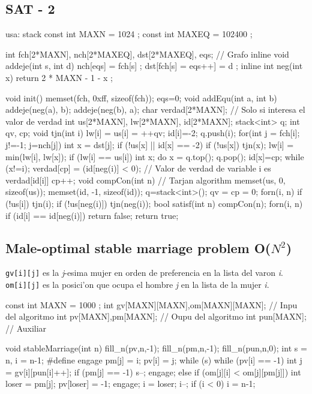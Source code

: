 \documentclass[10pt,landscape,twocolumn,a4paper,notitlepage]{article}
\begin{document}
\subsection{SAT - 2}
\begin{code}
usa: stack
const int MAXN = 1024 ;
const int MAXEQ = 102400 ;

int fch[2*MAXN], nch[2*MAXEQ], dst[2*MAXEQ], eqs; // Grafo
inline void addeje(int s, int d) { nch[eqs] = fch[s] ; dst[fch[s] = eqs++] = d ; }
inline int neg(int x) { return 2 * MAXN - 1 - x ; }

void init() {
	memset(fch, 0xff, sizeof(fch));
	eqs=0;
}
void addEqu(int a, int b) {
	addeje(neg(a), b);
	addeje(neg(b), a);
}
char verdad[2*MAXN]; // Solo si interesa el valor de verdad
int us[2*MAXN], lw[2*MAXN], id[2*MAXN];
stack<int> q; int qv, cp;
void tjn(int i) {
	lw[i] = us[i] = ++qv;
	id[i]=-2; q.push(i);
	for(int j = fch[i]; j!=-1; j=nch[j]) { int x = dst[j];
		if (!us[x] || id[x] == -2) {
			if (!us[x]) tjn(x);
			lw[i] = min(lw[i], lw[x]);
		}
	}
	if (lw[i] == us[i]) {
		int x; do { x = q.top(); q.pop(); id[x]=cp; } while (x!=i);
        verdad[cp] = (id[neg(i)] < 0); // Valor de verdad de variable i es verdad[id[i]]
		cp++;
	}
}
void compCon(int n) { // Tarjan algorithm
	memset(us, 0, sizeof(us));
	memset(id, -1, sizeof(id));
	q=stack<int>(); qv = cp = 0;
	forn(i, n) {
		if (!us[i]) tjn(i);
		if (!us[neg(i)]) tjn(neg(i));
	}
}
bool satisf(int n) {
	compCon(n);
	forn(i, n) if (id[i] == id[neg(i)]) return false;
	return true;
}
\end{code}
\subsection{Male-optimal stable marriage problem O($N^2$)}
\verb+gv[i][j]+ es la \textit{j}-esima mujer en orden de preferencia en la lista del varon \textit{i}. \\
\verb+om[i][j]+ es la posici'on que ocupa el hombre \textit{j} en la lista de la mujer \textit{i}.
\begin{code}
const int MAXN = 1000 ;
int gv[MAXN][MAXN],om[MAXN][MAXN]; // Inpu del algoritmo
int pv[MAXN],pm[MAXN];             // Oupu del algoritmo
int pun[MAXN];                     // Auxiliar

void stableMarriage(int n) {
	fill_n(pv,n,-1); fill_n(pm,n,-1); fill_n(pun,n,0);
	int s = n, i = n-1;
	#define engage pm[j] = i; pv[i] = j;
	while (s) {
		while (pv[i] == -1) {
			int j = gv[i][pun[i]++];
			if (pm[j] == -1) {
				s--; engage;
			}
			else if (om[j][i] < om[j][pm[j]]) {
				int loser = pm[j];
				pv[loser] = -1;
				engage;
				i = loser;
			}
		}
		i--; if (i < 0) i = n-1;
} }
\end{code}
\end{document}
